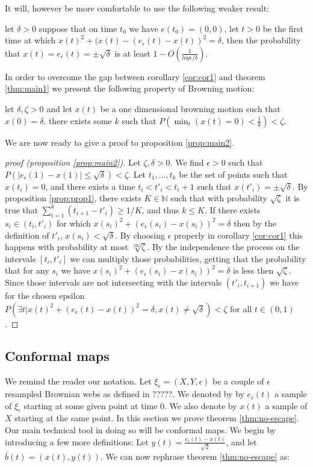 {It will, however be more comfortable to use the following weaker
result:
\begin{cor}\label{cor:cor1}
let $\delta>0$ suppose that on time $t_0$ we have $e(t_0)=(0,0)$, let
$t>0$ be the first time at which
$x(t)^2+(x(t)-(e_\epsilon(t)-x(t))^2=\delta$, then the probability
that $x(t)=e_\epsilon(t)=\pm\sqrt\delta$ is at least
$1-O(\frac{1}{log\epsilon/\delta})$.
\end{cor}

In order to overcome the gap between corollary \ref{cor:cor1} and
theorem \ref{thm:main1} we present the following property of Browning
motion:
\begin{propos}\label{prop:prop1}
let $\delta,\zeta>0$ and let $x(t)$ be a one dimensional browning
motion such that $x(0)=\delta$. there exists some $k$ such that
$P(\min_t(x(t)=0)<\frac1k)<\zeta$.
\end{propos}

We are now ready to give a proof to proposition \ref{prop:main2}.

\begin{proof}[proof (proposition \ref{prop:main2})]
Let $\zeta,\delta>0$. We find $\epsilon>0$ such that
$P(|e_\epsilon(1)- x(1)|\le\sqrt\delta)<\zeta$. Let $t_1,...,t_k$ be
the set of points such that $x(t_i)=0$, and there exists a time
$t_i<t'_i<t_i+1$ such that $x(t'_i)=\pm\sqrt\delta$. By proposition
\ref{prop:prop1}, there exists $K\in\mathbb{N}$ such that with
probability $\sqrt\zeta$ it is true that
$\sum_{i=1}^k(t_{i+1}-t'_i)\ge1/K$, and thus $k\le K$. If there exists
$s_i\in (t_i, t'_i)$ for which
$x(s_i)^2+(e_\epsilon(s_i)-x(s_i))^2=\delta$ then by the definition of
$t'_i$, $x(s_i)<\sqrt\delta$. By choosing $\epsilon$ properly in
corollary \ref{cor:cor1} this happens with probability at most
$\sqrt[2K]{\zeta}$. By the independence the process on the intervals
$[t_i,t'_i]$ we can multiply those probabilities, getting that the
probability that for any $s_i$ we have
$x(s_i)^2+(e_\epsilon(s_i)-x(s_i))^2=\delta$ is less then
$\sqrt\zeta$. Since those intervals are not intersecting with the
intervals $(t'_i,t_{i+1})$ we have for the chosen epsilon $P(\exists t
| x(t)^2+(e_\epsilon(t)-x(t))^2=\delta, x(t)\neq \sqrt \delta)<\zeta$
for all $t\in(0,1)$.
\end{proof}

\subsection{Conformal maps}\label{sec:conformal map}
We remind the reader our notation. Let $\xi_\epsilon=(X,Y,\epsilon)$
be a couple of $\epsilon$ resampled Brownian webs as defined in
?????. We denoted by by $e_\epsilon(t)$ a sample of $\xi_\epsilon$
starting at some given point at time $0$. We also denote by $x(t)$ a
sample of $X$ starting at the same point.  In this section we prove
theorem \ref{thm:no-escape}. Our main technical tool in doing so will
be conformal maps. We begin by introducing a few more definitions: Let
$y(t)=\frac{e_\epsilon(t)-x(t)}{\sqrt2}$, and let
$\bar{b}(t)=(x(t),y(t))$. We can now rephrase theorem
\ref{thm:no-escape} as:

}
